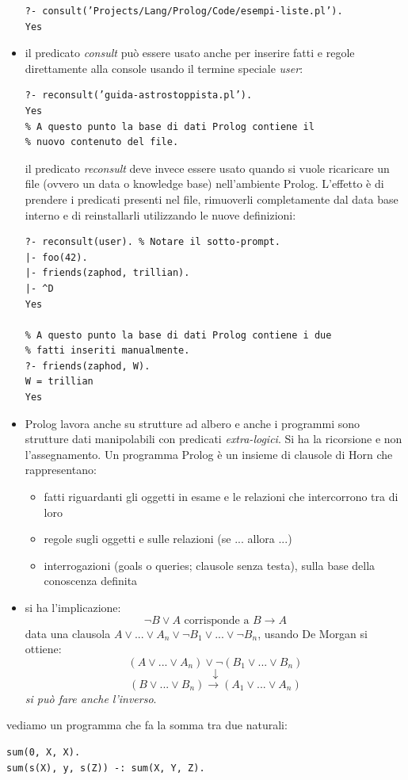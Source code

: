 \documentclass[a4paper,12pt, oneside]{book}
\begin{document}
\begin{itemize}
\begin{verbatim}
?- consult(’Projects/Lang/Prolog/Code/esempi-liste.pl’).
Yes
\end{verbatim}
\item il predicato \textit{consult} può essere usato anche per inserire fatti e regole direttamente alla console usando il termine speciale \textit{user}:
\begin{verbatim}
?- reconsult(’guida-astrostoppista.pl’).
Yes
% A questo punto la base di dati Prolog contiene il
% nuovo contenuto del file.
\end{verbatim}
il predicato \textit{reconsult} deve invece essere usato quando si vuole ricaricare un file (ovvero un data o knowledge base) nell'ambiente Prolog. L’effetto è di prendere i predicati presenti nel file, rimuoverli completamente dal data base interno e di reinstallarli utilizzando le nuove definizioni:
\begin{verbatim}
?- reconsult(user). % Notare il sotto-prompt.
|- foo(42).
|- friends(zaphod, trillian).
|- ^D
Yes

% A questo punto la base di dati Prolog contiene i due
% fatti inseriti manualmente.
?- friends(zaphod, W).
W = trillian
Yes
\end{verbatim}
\item Prolog lavora anche su strutture ad albero e anche i programmi sono strutture dati manipolabili con predicati \textit{extra-logici}. Si ha la ricorsione e non l'assegnamento. Un programma Prolog è un insieme di clausole di Horn che rappresentano:
\begin{itemize}
\item fatti riguardanti gli oggetti in esame e le relazioni che intercorrono tra di loro
\item regole sugli oggetti e sulle relazioni (se ... allora ...)
\item interrogazioni (goals o queries; clausole senza testa), sulla base della conoscenza definita
\end{itemize}
\item si ha l'implicazione: 
$$\neg B \vee A \mbox{ corrisponde a } B\to A$$
data una clausola $A\vee ... \vee A_n\vee \neg B_1\vee ... \vee\neg B_n$, usando De Morgan si ottiene:
$$(A\vee ... \vee A_n)\vee \neg (B_1\vee ... \vee B_n)$$
$$\downarrow$$
$$(B\vee ... \vee B_n)\to (A_1\vee ... \vee A_n)$$
\textit{si può fare anche l'inverso}.\\
\end{itemize}
vediamo un programma che fa la somma tra due naturali:
\begin{verbatim}
sum(0, X, X).
sum(s(X), y, s(Z)) -: sum(X, Y, Z).
\end{verbatim}
\end{document}
